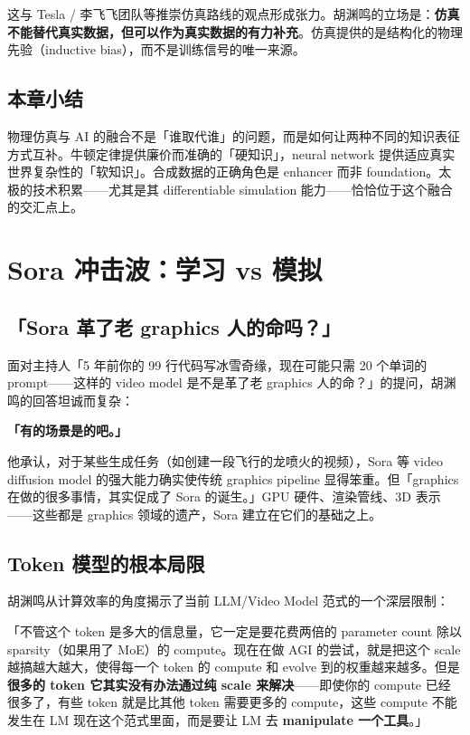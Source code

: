 \documentclass[a4paper]{article}
\begin{document}
这与 Tesla / 李飞飞团队等推崇仿真路线的观点形成张力。胡渊鸣的立场是：\textbf{仿真不能替代真实数据，但可以作为真实数据的有力补充}。仿真提供的是结构化的物理先验（inductive bias），而不是训练信号的唯一来源。

\subsection{本章小结}
物理仿真与 AI 的融合不是「谁取代谁」的问题，而是如何让两种不同的知识表征方式互补。牛顿定律提供廉价而准确的「硬知识」，neural network 提供适应真实世界复杂性的「软知识」。合成数据的正确角色是 enhancer 而非 foundation。太极的技术积累——尤其是其 differentiable simulation 能力——恰恰位于这个融合的交汇点上。

\section{Sora 冲击波：学习 vs 模拟}

\subsection{「Sora 革了老 graphics 人的命吗？」}

面对主持人「5 年前你的 99 行代码写冰雪奇缘，现在可能只需 20 个单词的 prompt——这样的 video model 是不是革了老 graphics 人的命？」的提问，胡渊鸣的回答坦诚而复杂：

\textbf{「有的场景是的吧。」}

他承认，对于某些生成任务（如创建一段飞行的龙喷火的视频），Sora 等 video diffusion model 的强大能力确实使传统 graphics pipeline 显得笨重。但「graphics 在做的很多事情，其实促成了 Sora 的诞生。」GPU 硬件、渲染管线、3D 表示——这些都是 graphics 领域的遗产，Sora 建立在它们的基础之上。

\subsection{Token 模型的根本局限}

胡渊鸣从计算效率的角度揭示了当前 LLM/Video Model 范式的一个深层限制：

「不管这个 token 是多大的信息量，它一定是要花费两倍的 parameter count 除以 sparsity（如果用了 MoE）的 compute。现在在做 AGI 的尝试，就是把这个 scale 越搞越大越大，使得每一个 token 的 compute 和 evolve 到的权重越来越多。但是\textbf{很多的 token 它其实没有办法通过纯 scale 来解决}——即使你的 compute 已经很多了，有些 token 就是比其他 token 需要更多的 compute，这些 compute 不能发生在 LM 现在这个范式里面，而是要让 LM 去 \textbf{manipulate 一个工具}。」
\end{document}
